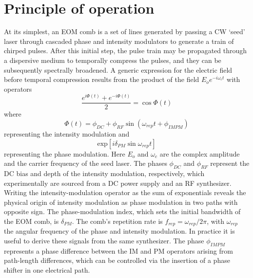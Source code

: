 \section{Principle of operation}
At its simplest, an EOM comb is a set of lines generated by passing a CW `seed' laser through cascaded phase and intensity modulators to generate a train of chirped pulses. After this initial step, the pulse train may be propagated through a dispersive medium to temporally compress the pulses, and they can be subsequently spectrally broadened. A generic expression for the electric field before temporal compression results from the product of the field $E_oe^{-i\omega_ct}$ with operators
\begin{equation}
\frac{e^{i\Phi(t)}+e^{-i\Phi(t)}}{2}=\cos\Phi(t)
\end{equation}
where
\begin{equation}
\Phi(t)=\phi_{DC}+\phi_{RF}\sin{(\omega_{rep}t+\phi_{IMPM})}
\end{equation}
representing the intensity modulation and 
\begin{equation}
\mathrm{exp}\left[i\delta_{PM} \sin{\omega_{rep} t}\right]
\end{equation} representing the phase modulation. Here $E_o$ and $\omega_c$ are the complex amplitude and the carrier frequency of the seed laser. The phases  $\phi_{DC}$ and $\phi_{RF}$ represent the DC bias and depth of the intensity modulation, respectively, which experimentally are sourced from a DC power supply and an RF synthesizer. Writing the intensity-modulation operator as the sum of exponentials reveals the physical origin of intensity modulation as phase modulation in two paths with opposite sign. The phase-modulation index, which sets the initial bandwidth of the EOM comb, is $\delta_{PM}$. The comb's repetition rate is $f_{rep}=\omega_{rep}/2\pi$, with $\omega_{rep}$ the angular frequency of the phase and intensity modulation. In practice it is useful to derive these signals from the same synthesizer. The phase $\phi_{IMPM}$ represents a phase difference between the IM and PM operators arising from path-length differences, which can be controlled via the insertion of a phase shifter in one electrical path. 

